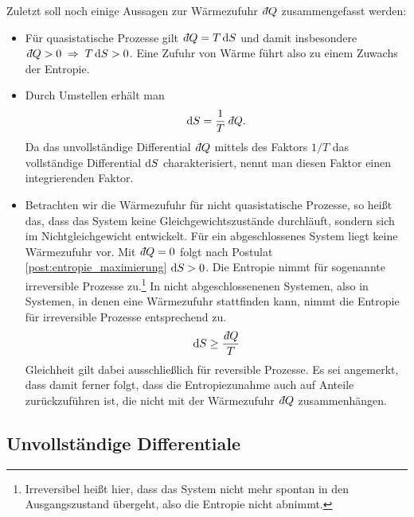 Zuletzt soll noch einige Aussagen zur Wärmezufuhr $\udiff Q$ zusammengefasst werden:
\begin{itemize}
    \item Für quasistatische Prozesse gilt $\udiff Q=T\diff S$ und damit insbesondere $\udiff Q>0\implication T\diff S>0$. Eine Zufuhr von Wärme führt also zu einem Zuwachs der Entropie. 
    \item Durch Umstellen erhält man 
    \begin{align*}
        \diff S = \frac{1}{T}\udiff Q.
    \end{align*}
    Da das unvollständige Differential $\udiff Q$ mittels des Faktors $1/T$ das vollständige Differential $\mathop{}\!\mathrm{d} S$ charakterisiert, nennt man diesen Faktor einen integrierenden Faktor.
    \item Betrachten wir die Wärmezufuhr für nicht quasistatische Prozesse, so heißt das, dass das System keine Gleichgewichtszustände durchläuft, sondern sich im Nichtgleichgewicht entwickelt. Für ein abgeschlossenes System liegt keine Wärmezufuhr vor. Mit $\udiff Q=0$ folgt nach Postulat \ref{post:entropie_maximierung} $\mathop{}\!\mathrm{d} S >0$. Die Entropie nimmt für sogenannte irreversible Prozesse zu.\footnote[4]{Irreversibel heißt hier, dass das System nicht mehr spontan in den Ausgangszustand übergeht, also die Entropie nicht abnimmt.} In nicht abgeschlossenenen Systemen, also in Systemen, in denen eine Wärmezufuhr stattfinden kann, nimmt die Entropie für irreversible Prozesse entsprechend zu.
    \begin{align*}
        \diff S\geq \frac{\udiff Q}{T}
    \end{align*}
    Gleichheit gilt dabei ausschließlich für reversible Prozesse. Es sei angemerkt, dass damit ferner folgt, dass die Entropiezunahme auch auf Anteile zurückzuführen ist, die nicht mit der Wärmezufuhr $\udiff Q$ zusammenhängen.
\end{itemize}

\subsection{Unvollständige Differentiale}

